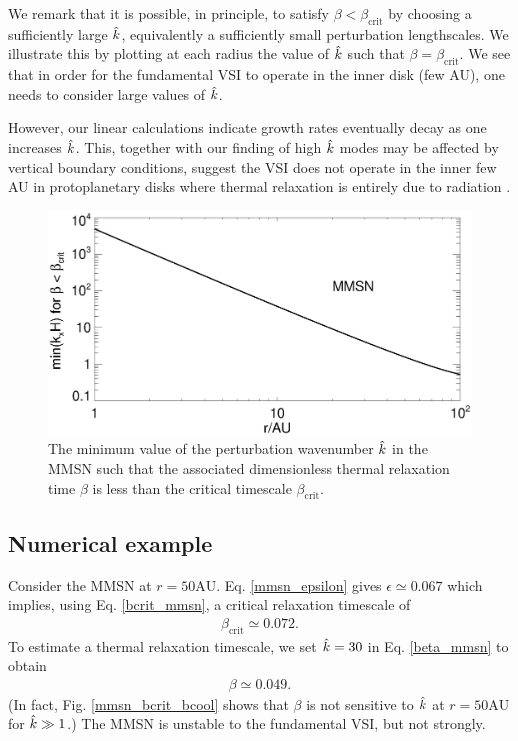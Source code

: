 We remark that it is possible, in principle, to satisfy $\beta <
\beta_\mathrm{crit}$ by choosing a sufficiently large $\hat{k}$,
equivalently a sufficiently small perturbation lengthscales. We
illustrate this by plotting at each radius the value of $\hat{k}$ such
that $\beta = \beta_\mathrm{crit}$. We see that in order for the
fundamental VSI to operate in the inner disk (few AU), one needs to
consider large values of $\hat{k}$. 

However, our linear
calculations indicate growth rates eventually decay as one increases
$\hat{k}$. This, together with our finding of high $\hat{k}$ modes may be
affected by vertical boundary conditions, suggest the VSI does not
operate in the inner few AU in protoplanetary disks where thermal
relaxation is entirely due to radiation \citep[cf.][]{stoll14}. 

\begin{figure}
  \includegraphics[width=\linewidth]{figures/bcrit_mink} 
  \caption{The minimum value of the perturbation wavenumber $\hat{k}$ in
    the MMSN such that the associated dimensionless thermal
    relaxation time  $\beta$ is  less than the critical timescale
    $\beta_\mathrm{crit}$. 
    \label{mmsn_bcrit_bcool_mink}}   
\end{figure}  


\subsection{Numerical example}\label{mmsn_example}
Consider  the MMSN at $r=50\mathrm{AU}$. Eq. \ref{mmsn_epsilon} gives
$\epsilon \simeq 
0.067$ which implies, using Eq. \ref{bcrit_mmsn}, a critical 
relaxation timescale of  
\begin{align*}
  \beta_\mathrm{crit} \simeq 0.072. 
\end{align*} 
To estimate a thermal relaxation timescale, we set $\hat{k}=30$ 
in Eq. \ref{beta_mmsn} to obtain 
\begin{align*}
  \beta \simeq 0.049.
\end{align*}
(In fact, Fig. \ref{mmsn_bcrit_bcool} shows that $\beta$  is not
sensitive to $\hat{k}$ at $r=50\mathrm{AU}$ for $\hat{k}\gg1$.)
The MMSN is unstable to the fundamental VSI, but not
strongly. 

